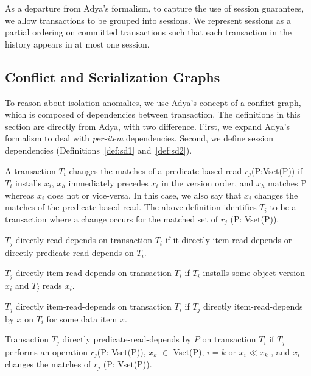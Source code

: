 As a departure from Adya's formalism, to capture the use of session
guarantees, we allow transactions to be grouped into sessions. We
represent sessions as a partial ordering on committed transactions
such that each transaction in the history appears in at most one
session.

\subsection{Conflict and Serialization Graphs}

To reason about isolation anomalies, we use Adya's concept of a
conflict graph, which is composed of dependencies between
transaction. The definitions in this section are directly from Adya,
with two difference. First, we expand Adya's formalism to deal
with \textit{per-item} dependencies. Second, we define session
dependencies (Definitions~\ref{def:sd1} and~\ref{def:sd2}).

\begin{definition}
A transaction $T_i$ changes the matches
of a predicate-based read $r_j$(P:Vset(P)) if $T_i$ installs $x_i$, $x_h$
immediately precedes $x_i$ in the version order, and $x_h$ matches
P whereas $x_i$ does not or vice-versa. In this case, we also
say that $x_i$ changes the matches of the predicate-based read.
The above deﬁnition identiﬁes $T_i$ to be a transaction where
a change occurs for the matched set of $r_j$ (P: Vset(P)).
\end{definition}

\begin{definition}
$T_j$ directly read-depends on transaction $T_i$ if it directly
item-read-depends or directly predicate-read-depends on $T_i$.
\end{definition}

\begin{definition}
$T_j$ directly item-read-depends on transaction $T_i$ if $T_i$ installs some
  object version $x_i$ and $T_j$ reads $x_i$.
\end{definition}

\begin{definition}
$T_j$ directly item-read-depends on transaction $T_i$ if $T_j$
  directly item-read-depends by $x$ on $T_i$ for some data item $x$.
\end{definition}

\begin{definition}
Transaction $T_j$ directly predicate-read-depends by $P$ on
transaction $T_i$ if $T_j$ performs an operation $r_j$(P: Vset(P)),
$x_k$ $\in$ Vset(P), $i = k$ or $x_i \ll x_k$ , and $x_i$ changes the
matches of $r_j$ (P: Vset(P)).
\end{definition}

